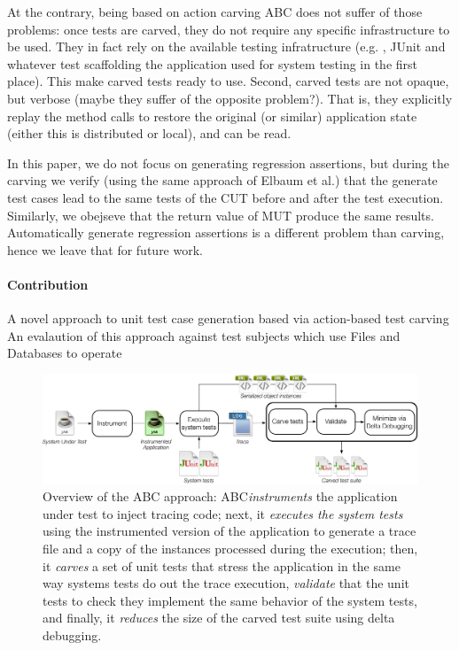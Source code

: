 \documentclass[10pt,conference]{IEEEtran}
\makeatletter
\gdef\xxx{\@ifnextchar[\xxx@lab\xxx@nolab}
\newcommand{\abc}{\textsf{ABC}\xspace}
\makeatother
\begin{document}
At the contrary,  being based on action carving \abc does not suffer of those problems: once tests are carved, they do not require any specific infrastructure to be used. They in fact rely on the available testing infratructure (e.g. , JUnit and whatever test scaffolding the application used for system testing in the first place). This make carved tests ready to use. Second, carved tests are not opaque, but verbose (maybe they suffer of the opposite problem?).
That is, they explicitly replay the method calls to restore the original (or similar) application state (either this is distributed or local), and can be read.

In this paper, we do not focus on generating regression assertions, but during the carving we verify (using the same approach of Elbaum et al.) that the generate test cases lead to the same tests of the CUT before and after the test execution. Similarly, we obejseve that the return value of MUT produce the same results. Automatically generate regression assertions is a different problem than carving, hence we leave that for future work.

\paragraph{Contribution}
A novel approach to unit test case generation based via action-based test carving
An evalaution of this approach against test subjects which use Files and Databases to operate

\begin{figure}[h!]
\centering
\includegraphics[width=\textwidth]{overview}
\caption{Overview of the \abc approach: \abc \emph{instruments} the application under test to inject tracing code; next, it \emph{executes the system tests} using the instrumented version of the application to generate a trace file and a copy of the instances processed during the execution; then, it \emph{carves} a set of unit tests that stress the application in the same way systems tests do out the trace execution, \emph{validate} that the unit tests to check they implement the same behavior of the system tests, and finally, it \emph{reduces} the size of the carved test suite using delta debugging.}\label{fig:overview}
\end{figure}
\end{document}

